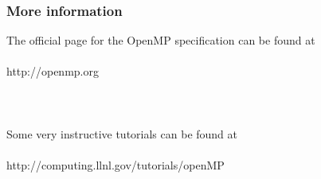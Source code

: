 \begin{frame}
  \frametitle{More information}
  \begin{center}
    The official page for the OpenMP specification can be found at \\~\\
    http://openmp.org \\~\\~\\~\\
    Some very instructive tutorials can be found at \\~\\
    http://computing.llnl.gov/tutorials/openMP
  \end{center}
\end{frame}



